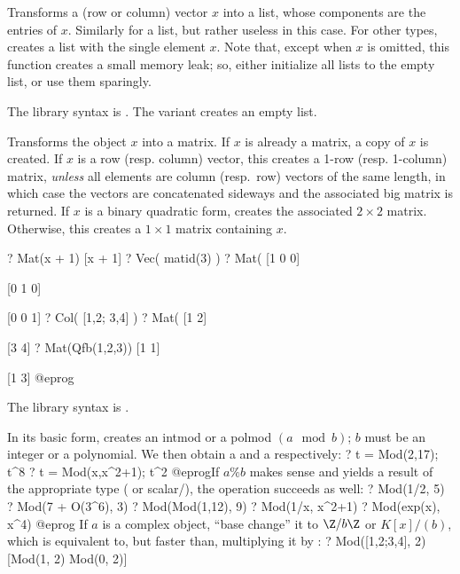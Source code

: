 \label{se:List}
Transforms a (row or column) vector $x$ into a list, whose components are
the entries of $x$. Similarly for a list, but rather useless in this case.
For other types, creates a list with the single element $x$. Note that,
except when $x$ is omitted, this function creates a small memory leak; so,
either initialize all lists to the empty list, or use them sparingly.

The library syntax is .
The variant  creates an empty list.

\label{se:Mat}
Transforms the object $x$ into a matrix.
If $x$ is already a matrix, a copy of $x$ is created.
If $x$ is a row (resp. column) vector, this creates a 1-row (resp.
1-column) matrix, \emph{unless} all elements are column (resp.~row) vectors
of the same length, in which case the vectors are concatenated sideways
and the associated big matrix is returned.
If $x$ is a binary quadratic form, creates the associated $2\times 2$
matrix. Otherwise, this creates a $1\times 1$ matrix containing $x$.

\bprog
? Mat(x + 1)
[x + 1]
? Vec( matid(3) )
? Mat(%
[1 0 0]

[0 1 0]

[0 0 1]
? Col( [1,2; 3,4] )
? Mat(%
[1 2]

[3 4]
? Mat(Qfb(1,2,3))
[1 1]

[1 3]
@eprog

The library syntax is .

\label{se:Mod}
In its basic form, creates an intmod or a polmod $(a \mod b)$; $b$ must
be an integer or a polynomial. We then obtain a  and a
 respectively:
\bprog
? t = Mod(2,17); t^8
? t = Mod(x,x^2+1); t^2
@eprog\noindent If $a \% b$ makes sense and yields a result of the
appropriate type ( or scalar/), the operation succeeds as
well:
\bprog
? Mod(1/2, 5)
? Mod(7 + O(3^6), 3)
? Mod(Mod(1,12), 9)
? Mod(1/x, x^2+1)
? Mod(exp(x), x^4)
@eprog
If $a$ is a complex object, ``base change'' it to $\Z/b\Z$ or $K[x]/(b)$,
which is equivalent to, but faster than, multiplying it by :
\bprog
? Mod([1,2;3,4], 2)
[Mod(1, 2) Mod(0, 2)]

